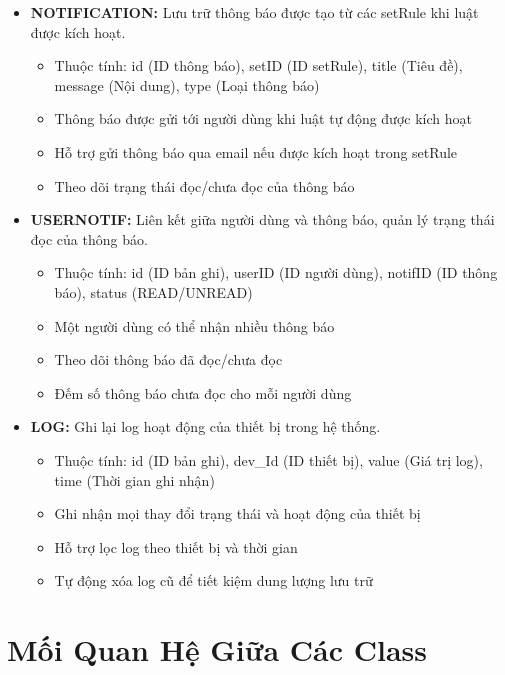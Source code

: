 \documentclass[12pt,a4paper]{article}
\begin{document}
\begin{itemize}
    \item \textbf{NOTIFICATION: } Lưu trữ thông báo được tạo từ các setRule khi luật được kích hoạt.
    \begin{itemize}
        \item Thuộc tính: id (ID thông báo), setID (ID setRule), title (Tiêu đề), message (Nội dung), type (Loại thông báo)
        \item Thông báo được gửi tới người dùng khi luật tự động được kích hoạt
        \item Hỗ trợ gửi thông báo qua email nếu được kích hoạt trong setRule
        \item Theo dõi trạng thái đọc/chưa đọc của thông báo
    \end{itemize}

    \item \textbf{USERNOTIF: } Liên kết giữa người dùng và thông báo, quản lý trạng thái đọc của thông báo.
    \begin{itemize}
        \item Thuộc tính: id (ID bản ghi), userID (ID người dùng), notifID (ID thông báo), status (READ/UNREAD)
        \item Một người dùng có thể nhận nhiều thông báo
        \item Theo dõi thông báo đã đọc/chưa đọc
        \item Đếm số thông báo chưa đọc cho mỗi người dùng
    \end{itemize}

    \item \textbf{LOG: } Ghi lại log hoạt động của thiết bị trong hệ thống.
    \begin{itemize}
        \item Thuộc tính: id (ID bản ghi), dev\_Id (ID thiết bị), value (Giá trị log), time (Thời gian ghi nhận)
        \item Ghi nhận mọi thay đổi trạng thái và hoạt động của thiết bị
        \item Hỗ trợ lọc log theo thiết bị và thời gian
        \item Tự động xóa log cũ để tiết kiệm dung lượng lưu trữ
    \end{itemize}
\end{itemize}

\section{Mối Quan Hệ Giữa Các Class}
\end{document}
